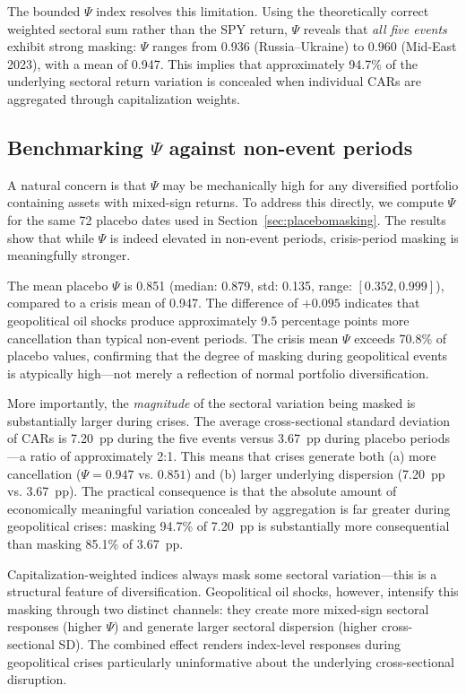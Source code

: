\documentclass[12pt,preprint,authoryear]{elsarticle}
\begin{document}
The bounded $\Psi$ index resolves this limitation. Using the theoretically correct weighted sectoral sum rather than the SPY return, $\Psi$ reveals that \textit{all five events} exhibit strong masking: $\Psi$ ranges from 0.936 (Russia--Ukraine) to 0.960 (Mid-East 2023), with a mean of 0.947. This implies that approximately 94.7\% of the underlying sectoral return variation is concealed when individual CARs are aggregated through capitalization weights.

\subsection{Benchmarking $\Psi$ against non-event periods}
A natural concern is that $\Psi$ may be mechanically high for any diversified portfolio containing assets with mixed-sign returns. To address this directly, we compute $\Psi$ for the same 72 placebo dates used in Section~\ref{sec:placebomasking}. The results show that while $\Psi$ is indeed elevated in non-event periods, crisis-period masking is meaningfully stronger.

The mean placebo $\Psi$ is 0.851 (median: 0.879, std: 0.135, range: $[0.352, 0.999]$), compared to a crisis mean of 0.947. The difference of $+0.095$ indicates that geopolitical oil shocks produce approximately 9.5 percentage points more cancellation than typical non-event periods. The crisis mean $\Psi$ exceeds 70.8\% of placebo values, confirming that the degree of masking during geopolitical events is atypically high---not merely a reflection of normal portfolio diversification.

More importantly, the \textit{magnitude} of the sectoral variation being masked is substantially larger during crises. The average cross-sectional standard deviation of CARs is 7.20~pp during the five events versus 3.67~pp during placebo periods---a ratio of approximately 2:1. This means that crises generate both (a) more cancellation ($\Psi = 0.947$ vs. $0.851$) and (b) larger underlying dispersion (7.20~pp vs. 3.67~pp). The practical consequence is that the absolute amount of economically meaningful variation concealed by aggregation is far greater during geopolitical crises: masking 94.7\% of 7.20~pp is substantially more consequential than masking 85.1\% of 3.67~pp.

Capitalization-weighted indices always mask some sectoral variation---this is a structural feature of diversification. Geopolitical oil shocks, however, intensify this masking through two distinct channels: they create more mixed-sign sectoral responses (higher $\Psi$) and generate larger sectoral dispersion (higher cross-sectional SD). The combined effect renders index-level responses during geopolitical crises particularly uninformative about the underlying cross-sectional disruption.
\end{document}
